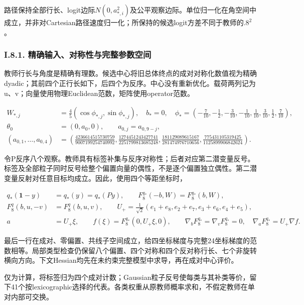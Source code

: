 \documentclass[11pt,a4paper]{article}
\begin{document}
路径保持全部行长、logit边际\(N(0,a_{*,i}^2)\)及公平观察边际。单位归一化在角空间中成立，并非对Cartesian路径速度归一化；所保持的候选logit方差不同于教师的\(.8^2\)。

\subsubsection*{I.8.1.
精确输入、对称性与完整参数空间}\label{i.8.1.-ux7cbeux786eux8f93ux5165ux5bf9ux79f0ux6027ux4e0eux5b8cux6574ux53c2ux6570ux7a7aux95f4}

教师行长与角度是精确有理数。候选中心将旧总体终点的成对对称化数值视为精确dyadic；其前四个正行长如下，后四个为反序。中心没有重新优化。载荷两列记为u、v；向量使用物理Euclidean范数，矩阵使用operator范数。

\[
\begin{aligned}
W_{*,j}&=\tfrac45(\cos\phi_{*,j},\sin\phi_{*,j}),\quad b_*=0,\quad
\phi_*=(-\tfrac7{10},-\tfrac12,-\tfrac3{10},-\tfrac1{10},\tfrac1{10},\tfrac3{10},\tfrac12,\tfrac7{10}),\\
\theta_0&=(0,a_0,0),\qquad a_{0,j}=a_{0,9-j},\\
(a_{0,1},\ldots,a_{0,4})&=
\left(\frac{4236614515730759}{9007199254740992},
\frac{1274451243427741}{2251799813685248},
\frac{181129089615167}{281474976710656},
\frac{775431105319425}{1125899906842624}\right).
\end{aligned}
\tag{I.21}
\]

令P反序八个观察。教师具有标签补集与反序对称性；后者对应第二潜变量反号。标签及全部粒子同时反号给整个偏置向量的偶性，不是逐个偏置独立偶性。第二潜变量反射对任意目标均成立。因此，使用四个等距坐标时，

\[
\begin{aligned}
q_*(\mathbf1-y)&=q_*(y)=q_*(Py),\qquad
F_8^{q_*}(-b,W)=F_8^{q_*}(b,W),\\
F_8^q(b,u,-v)&=F_8^q(b,u,v),\qquad
U_+=\frac1{\sqrt2}(e_1+e_8,e_2+e_7,e_3+e_6,e_4+e_5),\\
a&=U_+\xi,\qquad f(\xi)=F_8^{q_*}(0,U_+\xi,0),\qquad
\nabla_bF_8^{q_*}=\nabla_vF_8^{q_*}=0,\quad \nabla_aF_8^{q_*}=U_+\nabla f.
\end{aligned}
\tag{I.22}
\]

最后一行在成对、零偏置、共线子空间成立，给四坐标梯度与完整24坐标梯度的范数相等。局部类型检查仍保留八个偏置、四个对称和四个反对称行长、七个非旋转横向方向。下文Hessian均先在未约束完整模型中求导，再在成对中心评价。

仅为计算，将标签归为四个成对计数；Gaussian粒子反号使每类与其补类等价，留下41个按lexicographic选择的代表。各类权重从原教师概率求和，不假定教师在单对内部可交换。
\end{document}
